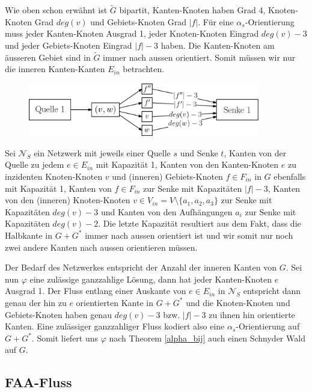 Wie oben schon erwähnt ist $\tilde{G}$ bipartit, Kanten-Knoten haben Grad 4, Knoten-Knoten Grad $deg(v)$ und Gebiets-Knoten Grad $|f|$. Für eine $\alpha_s$-Orientierung muss jeder Kanten-Knoten Ausgrad 1, jeder Knoten-Knoten Eingrad $deg(v)-3$ und jeder Gebiets-Knoten Eingrad $|f|-3$ haben. Die Kanten-Knoten am äusseren Gebiet sind in $\tilde{G}$ immer nach aussen orientiert. Somit müssen wir nur die inneren Kanten-Kanten $E_{in}$ betrachten. \

\begin{figure}[h]
	\centering
  \includegraphics[width=0.9\textwidth]{schnyder_flow.png}
\end{figure}

Sei $\mathcal{N}_S$ ein Netzwerk mit jeweils einer Quelle $s$ und Senke $t$, Kanten von der Quelle zu jedem $e \in E_{in}$ mit Kapazität 1, Kanten von den Kanten-Knoten $e$ zu inzidenten Knoten-Knoten $v$ und (inneren) Gebiets-Knoten $f \in F_{in}$ in $G$ ebenfalls mit Kapazität 1, Kanten von $f \in F_{in}$ zur Senke mit Kapazitäten $|f|-3$, Kanten von den (inneren) Knoten-Knoten $v \in V_{in} = V \setminus \{a_1,a_2,a_3\}$ zur Senke mit Kapazitäten $deg(v)-3$ und Kanten von den Aufhängungen $a_i$ zur Senke mit Kapazitäten $deg(v)-2$. Die letzte Kapazität resultiert aus dem Fakt, dass die Halbkante in $G+G^*$ immer nach aussen orientiert ist und wir somit nur noch zwei andere Kanten nach aussen orientieren müssen.

Der Bedarf des Netzwerkes entspricht der Anzahl der inneren Kanten von $G$. Sei nun $\varphi$ eine zulässige ganzzahlige Lösung, dann hat jeder Kanten-Knoten $e$ Ausgrad 1. Der Fluss entlang einer Auskante von $e \in E_{in}$ in $\mathcal{N}_S$ entspricht dann genau der hin zu $e$ orientierten Kante in $G+G^*$ und die Knoten-Knoten und Gebiets-Knoten haben genau $deg(v)-3$ bzw. $|f|-3$ zu ihnen hin orientierte Kanten. Eine zulässiger ganzzahliger Fluss kodiert also eine $\alpha_s$-Orientierung auf $G+G^*$. Somit liefert uns $\varphi$ nach Theorem \ref{alpha_bij} auch einen Schnyder Wald auf $G$.

\subsection{FAA-Fluss}\label{fas-flow}


